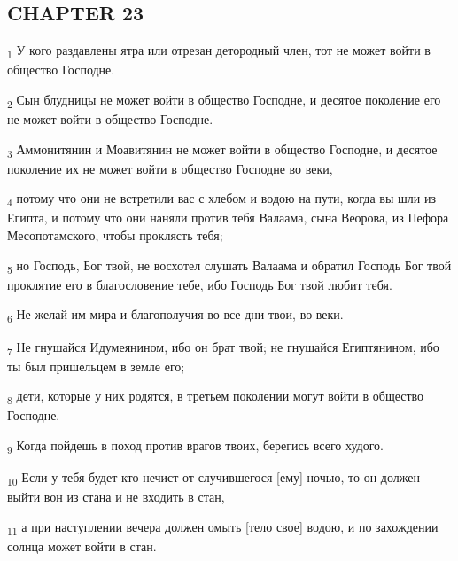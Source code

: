 \subsection{CHAPTER 23}
\begin{tcolorbox}
\textsubscript{1} У кого раздавлены ятра или отрезан детородный член, тот не может войти в общество Господне.
\end{tcolorbox}
\begin{tcolorbox}
\textsubscript{2} Сын блудницы не может войти в общество Господне, и десятое поколение его не может войти в общество Господне.
\end{tcolorbox}
\begin{tcolorbox}
\textsubscript{3} Аммонитянин и Моавитянин не может войти в общество Господне, и десятое поколение их не может войти в общество Господне во веки,
\end{tcolorbox}
\begin{tcolorbox}
\textsubscript{4} потому что они не встретили вас с хлебом и водою на пути, когда вы шли из Египта, и потому что они наняли против тебя Валаама, сына Веорова, из Пефора Месопотамского, чтобы проклясть тебя;
\end{tcolorbox}
\begin{tcolorbox}
\textsubscript{5} но Господь, Бог твой, не восхотел слушать Валаама и обратил Господь Бог твой проклятие его в благословение тебе, ибо Господь Бог твой любит тебя.
\end{tcolorbox}
\begin{tcolorbox}
\textsubscript{6} Не желай им мира и благополучия во все дни твои, во веки.
\end{tcolorbox}
\begin{tcolorbox}
\textsubscript{7} Не гнушайся Идумеянином, ибо он брат твой; не гнушайся Египтянином, ибо ты был пришельцем в земле его;
\end{tcolorbox}
\begin{tcolorbox}
\textsubscript{8} дети, которые у них родятся, в третьем поколении могут войти в общество Господне.
\end{tcolorbox}
\begin{tcolorbox}
\textsubscript{9} Когда пойдешь в поход против врагов твоих, берегись всего худого.
\end{tcolorbox}
\begin{tcolorbox}
\textsubscript{10} Если у тебя будет кто нечист от случившегося [ему] ночью, то он должен выйти вон из стана и не входить в стан,
\end{tcolorbox}
\begin{tcolorbox}
\textsubscript{11} а при наступлении вечера должен омыть [тело свое] водою, и по захождении солнца может войти в стан.
\end{tcolorbox}
